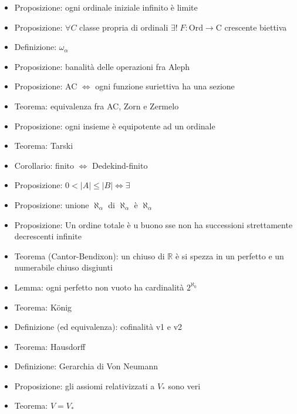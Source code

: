 \documentclass[a4paper]{article}
\newcommand{\R}{\mathbb{R}}
\begin{document}
\begin{multicols}{2}
\begin{itemize}
	\item Proposizione: ogni ordinale iniziale infinito è limite
	\item Proposizione: \(\forall C\) classe propria di ordinali \(\exists!\;F:\text{Ord}\to \text{C}\) crescente biettiva
	\item Definizione: \(\omega_\alpha\)
	\item Proposizione: banalità delle operazioni fra Aleph
	\item Proposizione: AC \(\iff\) ogni funzione suriettiva ha una sezione
	\item Teorema: equivalenza fra AC, Zorn e Zermelo
	\item Proposizione: ogni insieme è equipotente ad un ordinale
	\item Teorema: Tarski
	\item Corollario: finito \(\iff\) Dedekind-finito
	\item Proposizione: \(0<|A|\leq|B|\iff\exists\) 
	\item Proposizione: unione \(\aleph_\alpha\) di \(\aleph_\alpha\) è \(\aleph_\alpha\)
	\item Proposizione: Un ordine totale è u buono sse non ha successioni strettamente decrescenti infinite
	\item Teorema (Cantor-Bendixon): un chiuso di \(\R\) è si spezza in un perfetto e un numerabile chiuso disgiunti
	\item Lemma: ogni perfetto non vuoto ha cardinalità \(2^{\aleph_0}\)
	\item Teorema: König
  \item Definizione (ed equivalenza): cofinalità v1 e v2
  \item Teorema: Hausdorff
  \item Definizione: Gerarchia di Von Neumann
  \item Proposizione: gli assiomi relativizzati a \(V_*\) sono veri
  \item Teorema: \(V=V_*\)
\end{itemize}
\end{multicols}
\end{document}
